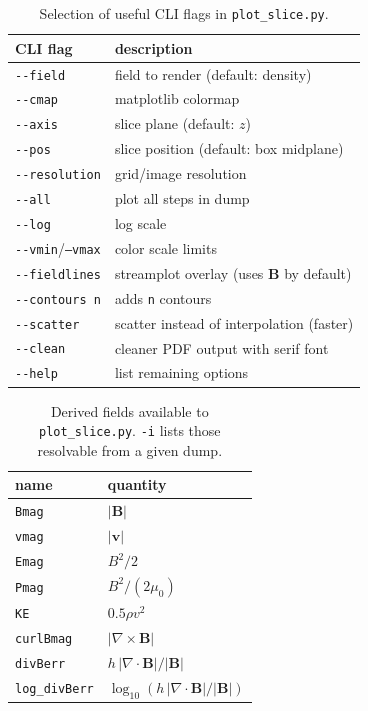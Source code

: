 \begin{table}[h]
\setlength{\abovecaptionskip}{6pt}%
\centering
\begin{tabular}{@{}ll@{}}
\toprule
CLI flag & description \\
\midrule
\texttt{-{}-field} & field to render (default: density) \\
\texttt{-{}-cmap} & matplotlib colormap \\
\texttt{-{}-axis} & slice plane (default: $z$) \\
\texttt{-{}-pos} & slice position (default: box midplane) \\
\texttt{-{}-resolution} & grid/image resolution \\
\texttt{-{}-all} & plot all steps in dump \\
\texttt{-{}-log} & log scale \\
\texttt{-{}-vmin}/\texttt{--vmax} & color scale limits \\
\texttt{-{}-fieldlines} & streamplot overlay (uses $\mathbf{B}$ by default) \\
\texttt{-{}-contours n} & adds \texttt{n} contours \\
\texttt{-{}-scatter} & scatter instead of interpolation (faster) \\
\texttt{-{}-clean} & cleaner PDF output with serif font \\
\texttt{-{}-help} & list remaining options \\
\bottomrule
\end{tabular}
\caption{Selection of useful CLI flags in \texttt{plot\_slice.py}.}
\label{tab:plot_slice_cli_flags}
\end{table}

\begin{table}[h]
\setlength{\abovecaptionskip}{6pt}%
\centering
\begin{tabular}{@{}ll@{}}
\toprule
name & quantity \\
\midrule
\texttt{Bmag} & $|\mathbf{B}|$ \\
\texttt{vmag} & $|\mathbf{v}|$ \\
\texttt{Emag} & $B^2/2$  \\
\texttt{Pmag} & $B^2/(2\mu_0)$ \\
\texttt{KE} & $0.5 \rho v^2$ \\
\texttt{curlBmag} & $|\nabla \times \mathbf{B}|$ \\
\texttt{divBerr} & $h\,|\nabla\cdot\mathbf{B}|/|\mathbf{B}|$  \\
\texttt{log\_divBerr} & $\log_{10} (h\,|\nabla\cdot\mathbf{B}|/|\mathbf{B}|)$ \\
\bottomrule
\end{tabular}
\caption{Derived fields available to \texttt{plot\_slice.py}. \texttt{-i} lists those
resolvable from a given dump.}
\label{tab:plot_slice_derived_fields}
\end{table}



